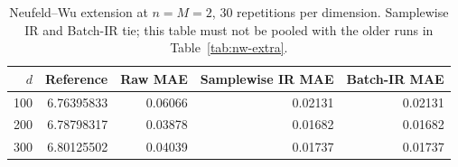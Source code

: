 \begin{table}[htbp]
\centering\small
\caption{Neufeld--Wu extension at $n=M=2$, 30 repetitions per dimension. Samplewise IR and Batch-IR tie; this table must not be pooled with the older runs in Table~\ref{tab:nw-extra}.}\label{tab:extended-nw}
\begin{tabular}{@{}rrrrr@{}}
\toprule
$d$ & Reference & Raw MAE & Samplewise IR MAE & Batch-IR MAE\\
\midrule
100 & 6.76395833 & 0.06066 & 0.02131 & 0.02131\\
200 & 6.78798317 & 0.03878 & 0.01682 & 0.01682\\
300 & 6.80125502 & 0.04039 & 0.01737 & 0.01737\\
\bottomrule
\end{tabular}
\end{table}

